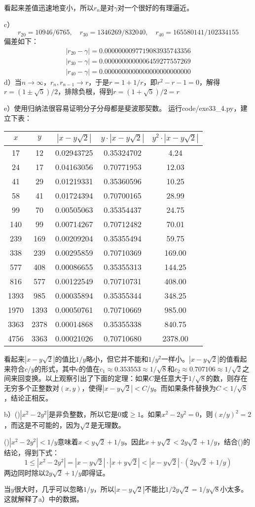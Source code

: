 看起来差值迅速地变小，所以$r_n$是对$\gamma$对一个很好的有理逼近。\par
c）
\[r_{20}=10946/6765,\quad r_{30}=1346269/832040,\quad r_{40}=165580141/102334155\]
偏差如下：
\begin{gather*}
|r_{20}-\gamma|=0.0000000097719083935743356\\
 |r_{30}-\gamma|=0.0000000000006459277557269\\
 |r_{40}-\gamma|=0.0000000000000000000000000
\end{gather*}
d）当$n\rightarrow\infty$，$r_n,r_{n-1}\rightarrow r$，于是$r=1+1/r$，即$r^2-r-1=0$，解得$r=(1\pm\sqrt{5})/2$，排除负根，得到$r=(1+\sqrt{5})/2=r$\par
e）使用归纳法很容易证明分子分母都是斐波那契数。
%
\exercise 运行code/exe33\_4.py，建立下表：
\begin{center}
\begin{tabular}{ccccc}
\hline
$x$ & $y$ & $|x-y\sqrt2|$ & $y\cdot |x-y\sqrt2|$ & $y^2\cdot |x-y\sqrt2|$ \\
\hline
17 & 12 & 0.02943725 & 0.35324702 & 4.24 \\
24 & 17 & 0.04163056 & 0.70771953 & 12.03 \\
41 & 29 & 0.01219331 & 0.35360596 & 10.25 \\
58 & 41 & 0.01724394 & 0.70700165 & 28.99 \\
99 & 70 & 0.00505063 & 0.35354437 & 24.75 \\
140 & 99 & 0.00714267 & 0.70712482 & 70.01 \\
239 & 169 & 0.00209204 & 0.35355494 & 59.75 \\
338 & 239 & 0.00295859 & 0.70710369 & 169.00 \\
577 & 408 & 0.00086655 & 0.35355313 & 144.25 \\
816 & 577 & 0.00122549 & 0.70710731 & 408.00 \\
1393 & 985 & 0.00035894 & 0.35355344 & 348.25 \\
1970 & 1393 & 0.00050761 & 0.70710669 & 985.00 \\
3363 & 2378 & 0.00014868 & 0.35355338 & 840.75 \\
4756 & 3363 & 0.00021026 & 0.70710680 & 2378.00 \\
\hline
\end{tabular}
\end{center}
看起来$|x-y\sqrt2|$的值比$1/y$略小，但它并不能和$1/y^2$一样小。$|x-y\sqrt2|$的值看起来符合$c/y$的形式，其中$c$的值在$c_1\approx 0.353553\approx 1/\sqrt8$和$c_2\approx 0.707106\approx 1/\sqrt2$之间来回变换。以上观察引出了下面的定理：如果$C$是任意大于$1/\sqrt8$的数，则存在无穷多个正整数对$(x,y)$，使得$|x-y\sqrt2|<C/y$。而如果条件替换为$C<1/\sqrt8$，结论正相反。\par
b）()$|x^2-2y^2|$是非负整数，所以它是0或$\ge1$。如果$x^2-2y^2=0$，则$(x/y)^2=2$，而这是不可能的，因为$\sqrt2$是无理数。\par
()$|x^2-2y^2|<1/y$意味着$x<y\sqrt2+1/y$。因此$x+y\sqrt2<2y\sqrt2+1/y$，结合()的结论，得到下式：
\[1\le |x^2-2y^2|=|x-y\sqrt2|\cdot|x+y\sqrt2|<|x-y\sqrt2|\cdot\left(2y\sqrt2+1/y\right)\]
两边同时除以$2y\sqrt2+1/y$即得证。\par
当$y$很大时，几乎可以忽略$1/y$，所以$|x-y\sqrt2|$不能比$1/2y\sqrt2=1/y\sqrt8$小太多。这就解释了a）中的数据。